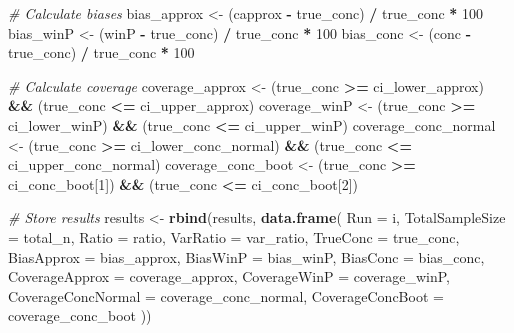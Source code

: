 \documentclass[
  letterpaper,
  DIV=11,
  numbers=noendperiod]{scrartcl}
\newenvironment{Shaded}{\begin{snugshade}}{\end{snugshade}}
\newcommand{\AttributeTok}[1]{\textcolor[rgb]{0.13,0.29,0.53}{#1}}
\newcommand{\CommentTok}[1]{\textcolor[rgb]{0.56,0.35,0.01}{\textit{#1}}}
\newcommand{\DecValTok}[1]{\textcolor[rgb]{0.00,0.00,0.81}{#1}}
\newcommand{\FunctionTok}[1]{\textcolor[rgb]{0.13,0.29,0.53}{\textbf{#1}}}
\newcommand{\NormalTok}[1]{#1}
\newcommand{\OtherTok}[1]{\textcolor[rgb]{0.56,0.35,0.01}{#1}}
\newcommand{\SpecialCharTok}[1]{\textcolor[rgb]{0.81,0.36,0.00}{\textbf{#1}}}
\begin{document}
\begin{Shaded}
\begin{Highlighting}[]
      \CommentTok{\# Calculate biases}
\NormalTok{      bias\_approx }\OtherTok{\textless{}{-}}\NormalTok{ (capprox }\SpecialCharTok{{-}}\NormalTok{ true\_conc) }\SpecialCharTok{/}\NormalTok{ true\_conc }\SpecialCharTok{*} \DecValTok{100}
\NormalTok{      bias\_winP }\OtherTok{\textless{}{-}}\NormalTok{ (winP }\SpecialCharTok{{-}}\NormalTok{ true\_conc) }\SpecialCharTok{/}\NormalTok{ true\_conc }\SpecialCharTok{*} \DecValTok{100}
\NormalTok{      bias\_conc }\OtherTok{\textless{}{-}}\NormalTok{ (conc }\SpecialCharTok{{-}}\NormalTok{ true\_conc) }\SpecialCharTok{/}\NormalTok{ true\_conc }\SpecialCharTok{*} \DecValTok{100}
      
      \CommentTok{\# Calculate coverage}
\NormalTok{      coverage\_approx }\OtherTok{\textless{}{-}}\NormalTok{ (true\_conc }\SpecialCharTok{\textgreater{}=}\NormalTok{ ci\_lower\_approx) }\SpecialCharTok{\&\&}\NormalTok{ (true\_conc }\SpecialCharTok{\textless{}=}\NormalTok{ ci\_upper\_approx)}
\NormalTok{      coverage\_winP }\OtherTok{\textless{}{-}}\NormalTok{ (true\_conc }\SpecialCharTok{\textgreater{}=}\NormalTok{ ci\_lower\_winP) }\SpecialCharTok{\&\&}\NormalTok{ (true\_conc }\SpecialCharTok{\textless{}=}\NormalTok{ ci\_upper\_winP)}
\NormalTok{      coverage\_conc\_normal }\OtherTok{\textless{}{-}}\NormalTok{ (true\_conc }\SpecialCharTok{\textgreater{}=}\NormalTok{ ci\_lower\_conc\_normal) }\SpecialCharTok{\&\&}\NormalTok{ (true\_conc }\SpecialCharTok{\textless{}=}\NormalTok{ ci\_upper\_conc\_normal)}
\NormalTok{      coverage\_conc\_boot }\OtherTok{\textless{}{-}}\NormalTok{ (true\_conc }\SpecialCharTok{\textgreater{}=}\NormalTok{ ci\_conc\_boot[}\DecValTok{1}\NormalTok{]) }\SpecialCharTok{\&\&}\NormalTok{ (true\_conc }\SpecialCharTok{\textless{}=}\NormalTok{ ci\_conc\_boot[}\DecValTok{2}\NormalTok{])}
      
      \CommentTok{\# Store results}
\NormalTok{      results }\OtherTok{\textless{}{-}} \FunctionTok{rbind}\NormalTok{(results, }\FunctionTok{data.frame}\NormalTok{(}
        \AttributeTok{Run =}\NormalTok{ i,}
        \AttributeTok{TotalSampleSize =}\NormalTok{ total\_n,}
        \AttributeTok{Ratio =}\NormalTok{ ratio,}
        \AttributeTok{VarRatio =}\NormalTok{ var\_ratio,}
        \AttributeTok{TrueConc =}\NormalTok{ true\_conc,}
        \AttributeTok{BiasApprox =}\NormalTok{ bias\_approx,}
        \AttributeTok{BiasWinP =}\NormalTok{ bias\_winP,}
        \AttributeTok{BiasConc =}\NormalTok{ bias\_conc,}
        \AttributeTok{CoverageApprox =}\NormalTok{ coverage\_approx,}
        \AttributeTok{CoverageWinP =}\NormalTok{ coverage\_winP,}
        \AttributeTok{CoverageConcNormal =}\NormalTok{ coverage\_conc\_normal,}
        \AttributeTok{CoverageConcBoot =}\NormalTok{ coverage\_conc\_boot}
\NormalTok{      ))}
      

\end{Highlighting}
\end{Shaded}
\end{document}
